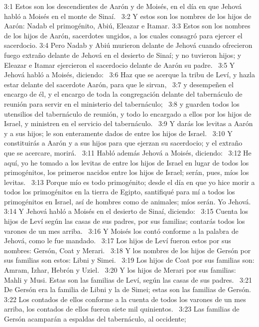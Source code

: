 3:1 Estos son los descendientes de Aarón y de Moisés, en el día en que Jehová habló a Moisés en el monte de Sinaí.  
3:2 Y estos son los nombres de los hijos de Aarón: Nadab el primogénito, Abiú, Eleazar e Itamar. 
3:3 Estos son los nombres de los hijos de Aarón, sacerdotes ungidos, a los cuales consagró para ejercer el sacerdocio. 
3:4 Pero Nadab y Abiú murieron delante de Jehová cuando ofrecieron fuego extraño delante de Jehová en el desierto de Sinaí; y no tuvieron hijos; y Eleazar e Itamar ejercieron el sacerdocio delante de Aarón su padre.  
3:5 Y Jehová habló a Moisés, diciendo:  
3:6 Haz que se acerque la tribu de Leví, y hazla estar delante del sacerdote Aarón, para que le sirvan,  
3:7 y desempeñen el encargo de él, y el encargo de toda la congregación delante del tabernáculo de reunión para servir en el ministerio del tabernáculo;  
3:8 y guarden todos los utensilios del tabernáculo de reunión, y todo lo encargado a ellos por los hijos de Israel, y ministren en el servicio del tabernáculo.  
3:9 Y darás los levitas a Aarón y a sus hijos; le son enteramente dados de entre los hijos de Israel.  
3:10 Y constituirás a Aarón y a sus hijos para que ejerzan su sacerdocio; y el extraño que se acercare, morirá.  
3:11 Habló además Jehová a Moisés, diciendo:  
3:12 He aquí, yo he tomado a los levitas de entre los hijos de Israel en lugar de todos los primogénitos, los primeros nacidos entre los hijos de Israel; serán, pues, míos los levitas.  
3:13 Porque mío es todo primogénito; desde el día en que yo hice morir a todos los primogénitos en la tierra de Egipto, santifiqué para mí a todos los primogénitos en Israel, así de hombres como de animales; míos serán. Yo Jehová.  
3:14 Y Jehová habló a Moisés en el desierto de Sinaí, diciendo:  
3:15 Cuenta los hijos de Leví según las casas de sus padres, por sus familias; contarás todos los varones de un mes arriba.  
3:16 Y Moisés los contó conforme a la palabra de Jehová, como le fue mandado.  
3:17 Los hijos de Leví fueron estos por sus nombres: Gersón, Coat y Merari.  
3:18 Y los nombres de los hijos de Gersón por sus familias son estos: Libni y Simei.  
3:19 Los hijos de Coat por sus familias son: Amram, Izhar, Hebrón y Uziel.  
3:20 Y los hijos de Merari por sus familias: Mahli y Musi. Estas son las familias de Leví, según las casas de sus padres.  
3:21 De Gersón era la familia de Libni y la de Simei; estas son las familias de Gersón.  
3:22 Los contados de ellos conforme a la cuenta de todos los varones de un mes arriba, los contados de ellos fueron siete mil quinientos.  
3:23 Las familias de Gersón acamparán a espaldas del tabernáculo, al occidente;  
